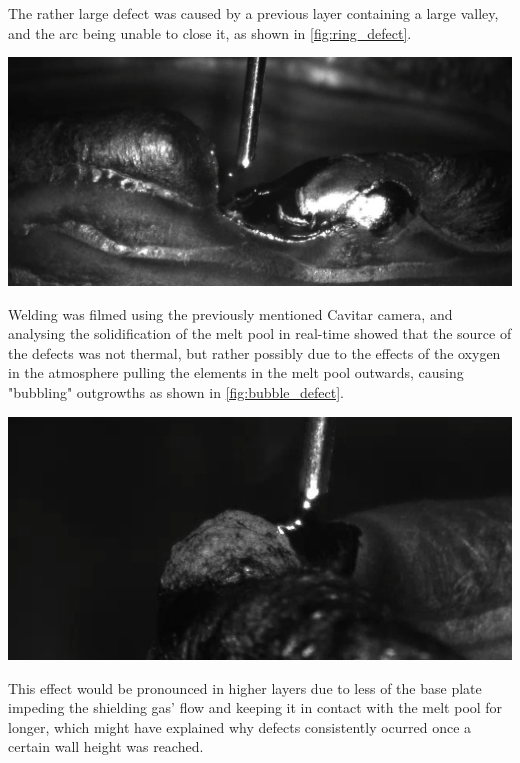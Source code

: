 The rather large defect was caused by a previous layer containing a large valley, and the arc being unable to close it, as shown in \autoref{fig:ring_defect}.

\begin{minipage}{\linewidth}
    \centering
    \includegraphics[width=\linewidth]{images/ring_defect.PNG}
    \label{fig:ring_defect}
\end{minipage}

Welding was filmed using the previously mentioned Cavitar camera, and analysing the solidification of the melt pool in real-time showed that the source of the defects was not thermal, but rather possibly due to the effects of the oxygen in the atmosphere pulling the elements in the melt pool outwards, causing "bubbling" outgrowths as shown in \autoref{fig:bubble_defect}.

\begin{minipage}{\linewidth}
    \centering
    \includegraphics[width=\linewidth]{images/bubble_defect.PNG}
    \label{fig:bubble_defect}
\end{minipage}

This effect would be pronounced in higher layers due to less of the base plate impeding the shielding gas' flow and keeping it in contact with the melt pool for longer, which might have explained why defects consistently ocurred once a certain wall height was reached.

